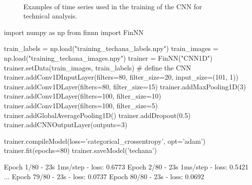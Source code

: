 \begin{figure}[htbp]
	\centering
	\\
	\caption{Examples of time series used in the training of the CNN for technical analysis.}
	\label{fig:patterns}
\end{figure}

\begin{ipython}
import numpy as np
from finnn import FinNN

train_labels = np.load("training_techana_labels.npy")
train_images = np.load("training_techana_images.npy")
trainer = FinNN("CNN1D")
trainer.setData(train_images, train_labels)
# define the CNN
trainer.addConv1DInputLayer(filters=80, filter_size=20,
input_size=(101, 1))
trainer.addConv1DLayer(filters=80, filter_size=15)
trainer.addMaxPooling1D(3)
trainer.addConv1DLayer(filters=100, filter_size=10)
trainer.addConv1DLayer(filters=100, filter_size=5)
trainer.addGlobalAveragePooling1D()
trainer.addDropout(0.5)
trainer.addCNNOutputLayer(outputs=3)

trainer.compileModel(loss='categorical_crossentropy', opt='adam')
trainer.fit(epochs=80)
trainer.saveModel('techana')
\end{ipython}
\begin{ioutput}
Epoch 1/80
- 23s 1ms/step - loss: 0.6773
Epoch 2/80
- 23s 1ms/step - loss: 0.5421
...
Epoch 79/80
- 23s - loss: 0.0737
Epoch 80/80
- 23s - loss: 0.0692
\end{ioutput}

